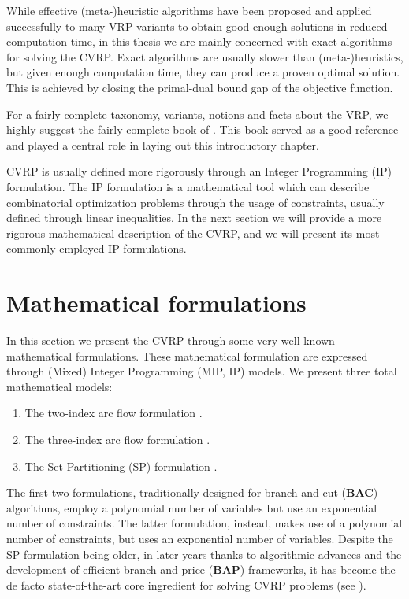 While effective (meta-)heuristic algorithms have been proposed and applied
successfully to many VRP variants to obtain good-enough solutions
in reduced computation time, in this thesis we are mainly concerned
with exact algorithms for solving the CVRP.
Exact algorithms are usually slower than (meta-)heuristics, but given
enough computation time, they can produce a proven optimal solution.
This is achieved by closing the primal-dual bound gap of the objective function.

\medskip

For a fairly complete taxonomy, variants, notions and facts about the VRP, we highly suggest
the fairly complete book  of \textcite{toth2014}.
This book served as a good reference and played a central role
in laying out this introductory chapter.

\medskip


CVRP is usually defined more rigorously through an Integer Programming (IP) formulation.
The IP formulation is a mathematical tool which can describe combinatorial optimization problems
through the usage of constraints, usually defined through linear inequalities.
In the next section we will provide a more rigorous mathematical
description of the CVRP, and we will present its most commonly employed IP formulations.


\section{Mathematical formulations}
\label{sec:intro-cvrp-mathematical-formulations}

In this section we present the CVRP through some very well known mathematical formulations.
These mathematical formulation are expressed through (Mixed) Integer Programming (MIP, IP)
models.
We present three total mathematical models:

\begin{enumerate}
    \setlength{\itemsep}{0pt}
    \setlength{\parskip}{0pt}

	\item The two-index arc flow formulation \parencite{laporte1983, laporte1985, laporte1986}.
	\item The three-index arc flow formulation \parencite{golden1977}.
	\item The Set Partitioning (SP) formulation \parencite{balinski1964}.
\end{enumerate}

The first two formulations, traditionally designed
for branch-and-cut (\textbf{BAC}) algorithms, employ a polynomial number of variables
but use an exponential number of constraints.
The latter formulation, instead, makes use of a polynomial number of constraints,
but uses an exponential number of variables.
Despite the SP formulation being older, in later years thanks to algorithmic advances
and the development of efficient branch-and-price (\textbf{BAP}) frameworks, it has become the de facto
state-of-the-art core ingredient for solving CVRP problems (see \cite{pessoa2020}).

